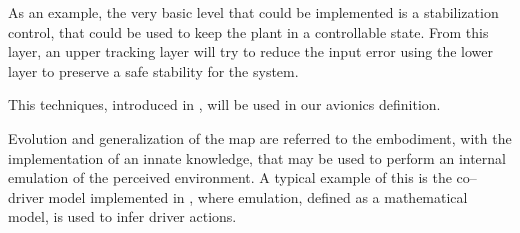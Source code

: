 As an example, the very basic level that could be implemented is a stabilization control, that could be used to keep the plant in a controllable state. From this layer, an upper tracking layer will try to reduce the input error using the lower layer to preserve a safe stability for the system.

This techniques, introduced in \citep{layeredmobilerobot}, will be used in our avionics definition.

Evolution and generalization of the map are referred to the embodiment, with the implementation of an innate knowledge, that may be used to perform an internal emulation of the perceived environment. A typical example of this is the co--driver model implemented in \citep{artificialcodriver}, where emulation, defined as a mathematical model, is used to infer driver actions.

